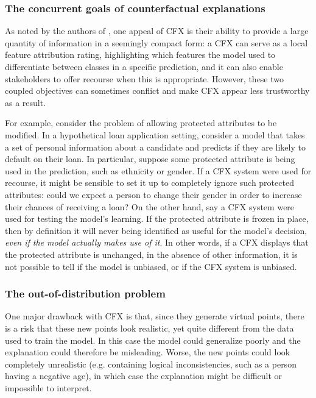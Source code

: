 \documentclass[../main.tex]{subfiles}
\begin{document}
\subsubsection{The concurrent goals of counterfactual explanations}

As noted by the authors of \cite{wachterCounterfactual2017}, one appeal of CFX is their ability to provide a large quantity of information in a seemingly compact form: a CFX can serve as a local feature attribution rating, highlighting which features the model used to differentiate between classes in a specific prediction, and it can also enable stakeholders to offer recourse when this is appropriate.
However, these two coupled objectives can sometimes conflict and make CFX appear less trustworthy as a result.

For example, consider the problem of allowing protected attributes to be modified.
In a hypothetical loan application setting, consider a model that takes a set of personal information about a candidate and predicts if they are likely to default on their loan.
In particular, suppose some protected attribute is being used in the prediction, such as ethnicity or gender.
If a CFX system were used for recourse, it might be sensible to set it up to completely ignore such protected attributes: could we expect a person to change their gender in order to increase their chances of receiving a loan?
On the other hand, say a CFX system were used for testing the model's learning. If the protected attribute is frozen in place, then by definition it will never being identified as useful for the model's decision, \emph{even if the model actually makes use of it}.
In other words, if a CFX displays that the protected attribute is unchanged, in the absence of other information, it is not possible to tell if the model is unbiased, or if the CFX system is unbiased.

\subsubsection{The out-of-distribution problem}

One major drawback with CFX is that, since they generate virtual points, there is a risk that these new points look realistic, yet quite different from the data used to train the model.
In this case the model could generalize poorly and the explanation could therefore be misleading.
Worse, the new points could look completely unrealistic (e.g. containing logical inconsistencies, such as a person having a negative age), in which case the explanation might be difficult or impossible to interpret.
\end{document}
